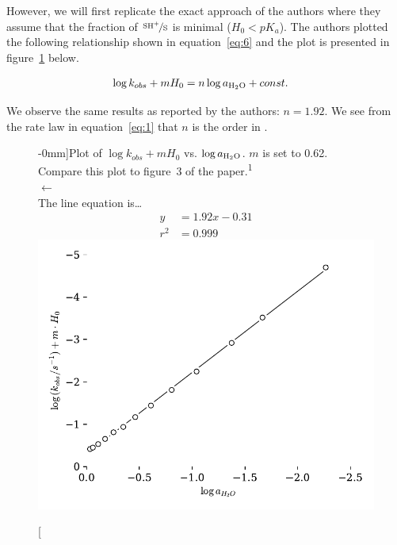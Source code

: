 \documentclass[]{tufte-handout}
\begin{document}
However, we will first replicate the exact approach of the authors where they assume that the fraction of $\nicefrac{\ce{SH+}}{\ce{S}}$ is minimal ($H_0<pK_a$). The authors plotted the following relationship shown in equation~\ref{eq:6} and the plot is presented in figure~\ref{fig:fig8} below.

\begin{align}
  \log{k_{obs}}+m H_0 &= n\log{a_{\ce{H2O}}} + const.
  \label{eq:6}
\end{align}

We observe the same results as reported by the authors: $n = 1.92$. We see from the rate law in equation~\ref{eq:1} that $n$ is the order in .


\begin{figure}[h!]
  \centering
  \caption[][-0mm]{Plot of $\log{k_{obs}}+m H_0$ vs. $\log{a_{\ce{H2O}}}$. $m$ is set to 0.62. Compare this plot to figure~3 of the paper.\textsuperscript{1}\\ $\longleftarrow$ \\ The line equation is\ldots 
  \begin{align*}
  y &= 1.92x-0.31 \\ 
  r^2 &= 0.999
  \end{align*}} 
  \includegraphics[scale=0.7]{images/fig8}
  \label{fig:fig8}
\end{figure}
\end{document}
